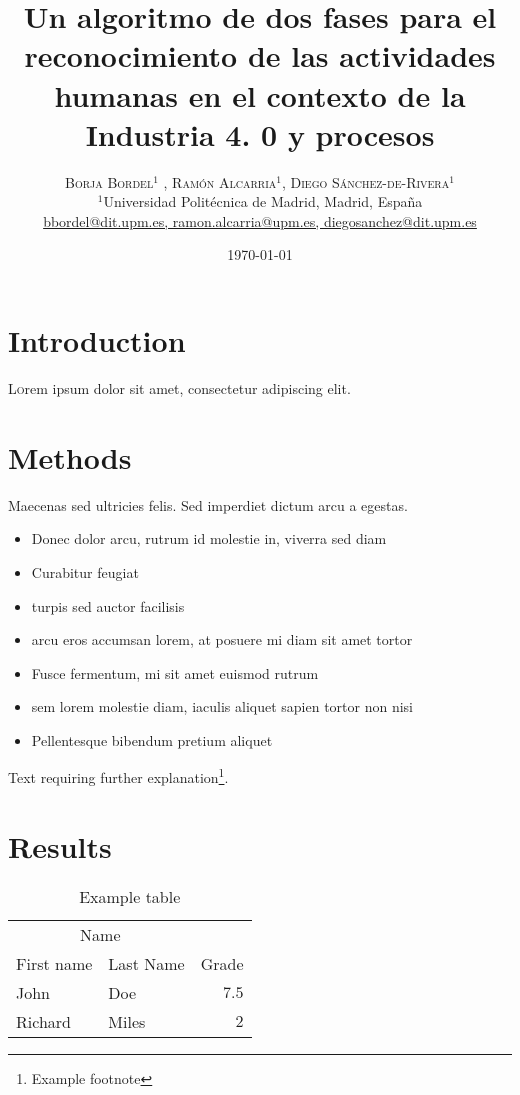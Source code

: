 \documentclass[twoside,twocolumn]{article}
\title{Un algoritmo de dos fases para el reconocimiento de las actividades humanas en el contexto de la Industria 4. 0 y procesos} %
\author{%
\textsc{Borja Bordel$^1$ , Ramón Alcarria$^1$, Diego Sánchez-de-Rivera$^1$} \\[1ex] %
\normalsize $^1$Universidad Politécnica de Madrid,
Madrid, España \\ %
\normalsize \href{mailto:bbordel@dit.upm.es, ramon.alcarria@upm.es, diegosanchez@dit.upm.es}{bbordel@dit.upm.es, ramon.alcarria@upm.es, diegosanchez@dit.upm.es} %
}
\date{\today} %
\begin{document}
\maketitle


\section{Introduction}

\lettrine[nindent=0em,lines=3]{L} orem ipsum dolor sit amet, consectetur adipiscing elit.
\blindtext %

\blindtext %


\section{Methods}

Maecenas sed ultricies felis. Sed imperdiet dictum arcu a egestas. 
\begin{itemize}
\item Donec dolor arcu, rutrum id molestie in, viverra sed diam
\item Curabitur feugiat
\item turpis sed auctor facilisis
\item arcu eros accumsan lorem, at posuere mi diam sit amet tortor
\item Fusce fermentum, mi sit amet euismod rutrum
\item sem lorem molestie diam, iaculis aliquet sapien tortor non nisi
\item Pellentesque bibendum pretium aliquet
\end{itemize}
\blindtext %

Text requiring further explanation\footnote{Example footnote}.


\section{Results}

\begin{table}
\caption{Example table}
\centering
\begin{tabular}{llr}
\toprule
\multicolumn{2}{c}{Name} \\
\cmidrule(r){1-2}
First name & Last Name & Grade \\
\midrule
John & Doe & $7.5$ \\
Richard & Miles & $2$ \\
\bottomrule
\end{tabular}
\end{table}
\end{document}
